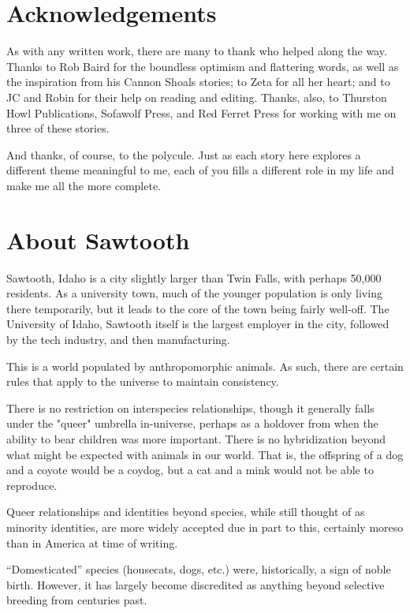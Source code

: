 \chapter*{Acknowledgements}

As with any written work, there are many to thank who helped along the way. Thanks to Rob Baird for the boundless optimism and flattering words, as well as the inspiration from his Cannon Shoals stories; to Zeta for all her heart; and to JC and Robin for their help on reading and editing. Thanks, also, to Thurston Howl Publications, Sofawolf Press, and Red Ferret Press for working with me on three of these stories.

And thanks, of course, to the polycule. Just as each story here explores a different theme meaningful to me, each of you fills a different role in my life and make me all the more complete.

\chapter*{About Sawtooth}

\vspace{0.4cm}

Sawtooth, Idaho is a city slightly larger than Twin Falls, with perhaps 50,000 residents. As a university town, much of the younger population is only living there temporarily, but it leads to the core of the town being fairly well-off. The University of Idaho, Sawtooth itself is the largest employer in the city, followed by the tech industry, and then manufacturing.

This is a world populated by anthropomorphic animals. As such, there are certain rules that apply to the universe to maintain consistency.

There is no restriction on interspecies relationships, though it generally falls under the "queer" umbrella in-universe, perhaps as a holdover from when the ability to bear children was more important. There is no hybridization beyond what might be expected with animals in our world. That is, the offspring of a dog and a coyote would be a coydog, but a cat and a mink would not be able to reproduce.

Queer relationships and identities beyond species, while still thought of as minority identities, are more widely accepted due in part to this, certainly moreso than in America at time of writing.

``Domesticated'' species (housecats, dogs, etc.) were, historically, a sign of noble birth. However, it has largely become discredited as anything beyond selective breeding from centuries past.

